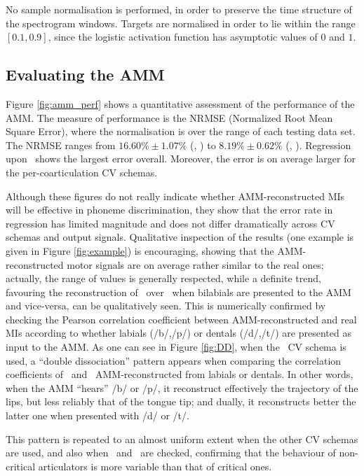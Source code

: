 No sample normalisation is performed, in order to preserve the time structure of the
spectrogram windows. Targets are normalised in order to lie within the range $[0.1,0.9]$,
since the logistic activation function has asymptotic values of $0$ and $1$.

\subsection{Evaluating the AMM}
\label{subsec:amm_results}

Figure \ref{fig:amm_perf} shows a quantitative assessment of the performance
of the AMM. The measure of performance is the NRMSE (Normalized Root Mean Square Error),
where the normalisation is over the range of each testing data set. The NRMSE
ranges from $16.60\% \pm 1.07\%$ (\vlio, \cob) to $8.19\% \pm 0.62\%$ (\vttu, \spkc).
Regression upon \vlio\ shows the largest error overall. Moreover, the error is on average
larger for the per-coarticulation CV schemas.

Although these figures do not really indicate whether AMM-reconstructed MIs will be
effective in phoneme discrimination, they show that the error rate in regression has
limited magnitude and does not differ dramatically across CV schemas and output signals.
Qualitative inspection of the results (one example is given in Figure \ref{fig:example})
is encouraging, showing that the AMM-reconstructed motor signals are on average rather
similar to the real ones; actually, the range of values is generally respected, while
a definite trend, favouring the reconstruction of \vlio\ over \vttu\ when bilabials are
presented to the AMM and vice-versa, can be qualitatively seen. This is numerically confirmed
by checking the Pearson correlation coefficient between AMM-reconstructed and real MIs
according to whether labials (/b/,/p/) or dentals (/d/,/t/) are presented as input
to the AMM. As one can see in Figure \ref{fig:DD}, when the \overall\ CV schema is used,
a ``double dissociation'' pattern appears when comparing the correlation coefficients of
\vlio\ and \vttu\ AMM-reconstructed from labials or dentals. In other words, when the AMM
``hears'' /b/ or /p/, it reconstruct effectively the trajectory of the lips, but less
reliably that of the tongue tip; and dually, it reconstructs better the latter one when
presented with /d/ or /t/.

This pattern is repeated to an almost uniform extent when the other CV schemas are used,
and also when \alio\ and \attu\ are checked, confirming that the behaviour of non-critical
articulators is more variable than that of critical ones.


